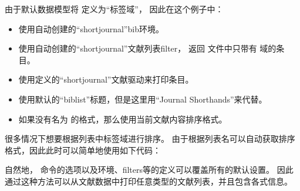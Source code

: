 \begin{ltxsyntax}
\begin{ltxexample}
\end{ltxexample}
%
由于默认数据模型将  定义为“标签域”，
因此在这个例子中：
\begin{itemize}
\item %
使用自动创建的“shortjournal”bib环境。
\item %
使用自动创建的“shortjournal”文献列表filter，
返回  文件中只带有  域的条目。
\item %
使用定义的“shortjournal”文献驱动来打印条目。
\item %
使用默认的“biblist”标题，但是这里用“Journal Shorthands”来代替。
\item %
如果没有名为  的格式，那么使用当前文献内容排序格式。
\end{itemize}
%
很多情况下想要根据列表中标签域进行排序。
由于根据列表名可以自动获取排序格式，因此此时可以简单地使用如下代码：

\begin{ltxexample}
\end{ltxexample}


自然地， 命令的选项以及环境、filters等的定义可以覆盖所有的默认设置。
因此通过这种方法可以从文献数据中打印任意类型的文献列表，并且包含各式信息。
\end{ltxsyntax}

